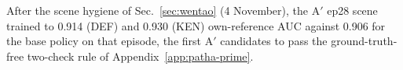 
After the scene hygiene of Sec.~\ref{sec:wentao} (4 November), the A$'$ ep28 scene trained to
0.914 (DEF) and 0.930 (KEN) own-reference AUC against 0.906 for the base policy on that episode,
the first A$'$ candidates to pass the ground-truth-free two-check rule of
Appendix~\ref{app:patha-prime}.
